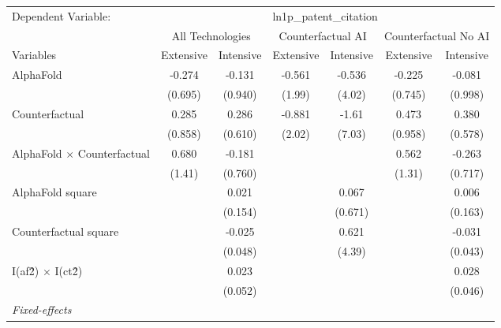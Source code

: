 \begingroup
\centering
\begin{tabular}{lcccccc}
   \tabularnewline \midrule \midrule
   Dependent Variable: & \multicolumn{6}{c}{ln1p\_patent\_citation}\\
 & \multicolumn{2}{c}{All Technologies} & \multicolumn{2}{c}{Counterfactual AI} & \multicolumn{2}{c}{Counterfactual No AI} \\
\cmidrule(lr){1-1}\cmidrule(lr){2-3} \cmidrule(lr){4-5} \cmidrule(lr){6-7}
Variables & \multicolumn{1}{c}{Extensive} & \multicolumn{1}{c}{Intensive} & \multicolumn{1}{c}{Extensive} & \multicolumn{1}{c}{Intensive} & \multicolumn{1}{c}{Extensive} & \multicolumn{1}{c}{Intensive} \\
\cmidrule(lr){1-1}\cmidrule(lr){2-2} \cmidrule(lr){3-3} \cmidrule(lr){4-4} \cmidrule(lr){5-5} \cmidrule(lr){6-6} \cmidrule(lr){7-7}
   AlphaFold                          & -0.274  & -0.131  & -0.561 & -0.536  & -0.225  & -0.081\\   
                                      & (0.695) & (0.940) & (1.99) & (4.02)  & (0.745) & (0.998)\\   
   Counterfactual                     & 0.285   & 0.286   & -0.881 & -1.61   & 0.473   & 0.380\\   
                                      & (0.858) & (0.610) & (2.02) & (7.03)  & (0.958) & (0.578)\\   
   AlphaFold $\times$ Counterfactual  & 0.680   & -0.181  &        &         & 0.562   & -0.263\\   
                                      & (1.41)  & (0.760) &        &         & (1.31)  & (0.717)\\   
   AlphaFold square                   &         & 0.021   &        & 0.067   &         & 0.006\\   
                                      &         & (0.154) &        & (0.671) &         & (0.163)\\   
   Counterfactual square              &         & -0.025  &        & 0.621   &         & -0.031\\   
                                      &         & (0.048) &        & (4.39)  &         & (0.043)\\   
   I(af\^2) $\times$ I(ct\^2)         &         & 0.023   &        &         &         & 0.028\\   
                                      &         & (0.052) &        &         &         & (0.046)\\   
   \midrule
   \emph{Fixed-effects}\\

\end{tabular}
